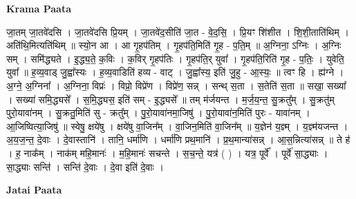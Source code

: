 \documentclass[17pt]{extarticle}
\begin{document}
\textbf{Krama Paata} \newline

जा॒तम् जा॒तवे॑दसि । जा॒तवे॑दसि प्रि॒यम् । जा॒तवे॑द॒सीति॑ जा॒त - वे॒द॒सि॒ । प्रि॒यꣳ शि॑शीत । शि॒शी॒ताति॑थिम् । अति॑थि॒मित्यति॑थिम् ॥ स्यो॒न आ । आ गृ॒हप॑तिम् । गृ॒हप॑ति॒मिति॑ गृ॒ह - प॒ति॒म् ॥ अ॒ग्निना॒ ऽग्निः । अ॒ग्निः सम् । समि॑द्ध्यते । इ॒द्ध्य॒ते॒ क॒विः । क॒विर् गृ॒हप॑तिः । गृ॒हप॑ति॒र् युवा᳚ । गृ॒हप॑ति॒रिति॑ गृ॒ह - प॒तिः॒ । युवेति॒ युवा᳚ ॥ ह॒व्य॒वाड् जु॒ह्वा᳚स्यः । ह॒व्य॒वाडिति॑ हव्य - वाट् । जु॒ह्वा᳚स्य॒ इति॑ जु॒हु - आ॒स्यः॒ ॥ त्वꣳ हि । ह्य॑ग्ने । अ॒ग्ने॒ अ॒ग्निना᳚ । अ॒ग्निना॒ विप्रः॑ । विप्रो॒ विप्रे॑ण । विप्रे॑ण॒ सन्न् । सन्थ् स॒ता । स॒तेति॑ स॒ता ॥ सखा॒ सख्या᳚ । सख्या॑ समि॒द्ध्यसे᳚ । स॒मि॒द्ध्यस॒ इति॑ सम् - इ॒द्ध्यसे᳚ ॥ तम् म॑र्जयन्त । म॒र्ज॒य॒न्त॒ सु॒क्रतु᳚म् । सु॒क्रतु॑म् पुरो॒यावा॑नम् । सु॒क्रतु॒मिति॑ सु - क्रतु᳚म् । पु॒रो॒यावा॑नमा॒जिषु॑ । पु॒रो॒यावा॑न॒मिति॑ पुरः - यावा॑नम् । आ॒जिष्वित्या॒जिषु॑ ॥ स्वेषु॒ क्षये॑षु । क्षये॑षु वा॒जिन᳚म् । वा॒जिन॒मिति॑ वा॒जिन᳚म् ॥ य॒ज्ञेन॑ य॒ज्ञ्म् । य॒ज्ञ्म॑यजन्त । अ॒य॒ज॒न्त॒ दे॒वाः । दे॒वास्तानि॑ । तानि॒ धर्मा॑णि । धर्मा॑णि प्रथ॒मानि॑ । प्र॒थ॒मान्या॑सन्न् । आ॒स॒न्नित्या॑सन्न् ॥ ते ह॑ । ह॒ नाक᳚म् । नाक॑म् महि॒मानः॑ । म॒हि॒मानः॑ सचन्ते । स॒च॒न्ते॒ यत्र॑ ( ) । यत्र॒ पूर्वे᳚ । पूर्वे॑ सा॒द्ध्याः । सा॒द्ध्याः सन्ति॑ । सन्ति॑ दे॒वाः । दे॒वा इति॑ दे॒वाः । \newline

\textbf{Jatai Paata} \newline
\end{document}
